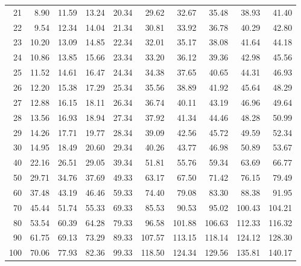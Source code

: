 \begin{mvtable}
{\begin{tabular}{r|*{9}{r}}
21 & 8.90 & 11.59 & 13.24 & 20.34 & 29.62 & 32.67 & 35.48 & 38.93 & 41.40\\
22 & 9.54 & 12.34 & 14.04 & 21.34 & 30.81 & 33.92 & 36.78 & 40.29 & 42.80\\
23 & 10.20 & 13.09 & 14.85 & 22.34 & 32.01 & 35.17 & 38.08 & 41.64 & 44.18\\
24 & 10.86 & 13.85 & 15.66 & 23.34 & 33.20 & 36.12 & 39.36 & 42.98 & 45.56\\
25 & 11.52 & 14.61 & 16.47 & 24.34 & 34.38 & 37.65 & 40.65 & 44.31 & 46.93\\
26 & 12.20 & 15.38 & 17.29 & 25.34 & 35.56 & 38.89 & 41.92 & 45.64 & 48.29\\
27 & 12.88 & 16.15 & 18.11 & 26.34 & 36.74 & 40.11 & 43.19 & 46.96 & 49.64\\
28 & 13.56 & 16.93 & 18.94 & 27.34 & 37.92 & 41.34 & 44.46 & 48.28 & 50.99\\
29 & 14.26 & 17.71 & 19.77 & 28.34 & 39.09 & 42.56 & 45.72 & 49.59 & 52.34\\
30 & 14.95 & 18.49 & 20.60 & 29.34 & 40.26 & 43.77 & 46.98 & 50.89 & 53.67\\
40 & 22.16 & 26.51 & 29.05 & 39.34 & 51.81 & 55.76 & 59.34 & 63.69 & 66.77\\
50 & 29.71 & 34.76 & 37.69 & 49.33 & 63.17 & 67.50 & 71.42 & 76.15 & 79.49\\
60 & 37.48 & 43.19 & 46.46 & 59.33 & 74.40 & 79.08 & 83.30 & 88.38 & 91.95\\
70 & 45.44 & 51.74 & 55.33 & 69.33 & 85.53 & 90.53 & 95.02 & 100.43 & 104.21\\
80 & 53.54 & 60.39 & 64.28 & 79.33 & 96.58 & 101.88 & 106.63 & 112.33 & 116.32\\
90 & 61.75 & 69.13 & 73.29 & 89.33 & 107.57 & 113.15 & 118.14 & 124.12 & 128.30\\
100 & 70.06 & 77.93 & 82.36 & 99.33 & 118.50 & 124.34 & 129.56 & 135.81 & 140.17\\
\bottomrule
\end{tabular}}
\end{mvtable}
